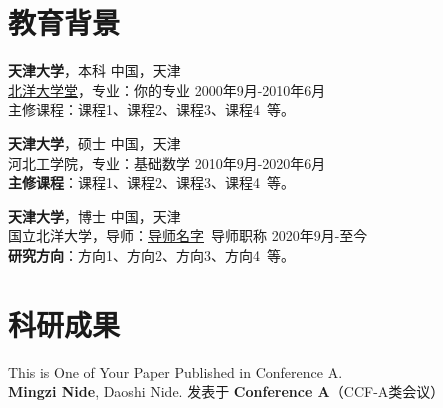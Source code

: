     \section{\makebox[\widthof{\faGraduationCap}][c]{\color{WHU_Blue}{\faGraduationCap}}\quad 教育背景}


    {\large \textbf{天津大学}}，本科 \hfill {中国，天津} \\
    \href{学院官网.whu.edu.cn}{\underline{北洋大学堂}}，专业：你的专业 \hfill {2000年9月-2010年6月} \\
    {主修课程}：课程1、课程2、课程3、课程4\ 等。

    \vspace{0.5em}
    {\large \textbf{天津大学}}，硕士 \hfill {中国，天津} \\
    {{河北工学院}}，专业：基础数学 \hfill {2010年9月-2020年6月} \\
    \textbf{主修课程}：课程1、课程2、课程3、课程4\ 等。

    \vspace{0.5em}
    {\large \textbf{天津大学}}，博士 \hfill {中国，天津} \\
    {{国立北洋大学}}，导师：\href{导师的个人主页.site}{导师名字}\ 导师职称 \hfill {2020年9月-至今} \\
    \textbf{研究方向}：方向1、方向2、方向3、方向4\ 等。

    \section{\makebox[\widthof{\faGraduationCap}][c]{\color{WHU_Blue}{\faGraduationCap}}\quad 科研成果}


    This is One of Your Paper Published in Conference A. \\
    \textbf{Mingzi Nide}, Daoshi Nide. \hfill 
    发表于 \textbf{Conference A}（CCF-A类会议） 

